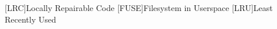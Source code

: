 \begin{acronym}
[LRC]{Locally Repairable Code}
[FUSE]{Filesystem in Userspace}
[LRU]{Least Recently Used}
\end{acronym}
